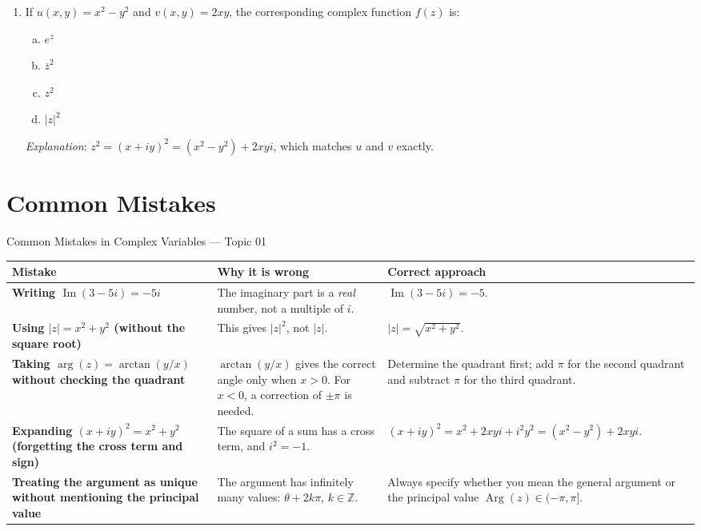 \documentclass[12pt,a4paper]{article}
\begin{document}
\begin{enumerate}
  \item If \(u(x,y) = x^2 - y^2\) and \(v(x,y) = 2xy\), the corresponding
        complex function \(f(z)\) is:
  \begin{enumerate}[(a)]
    \item \(e^z\)
    \item \(\overline{z}^2\)
    \item \textbf{\(z^2\)}
    \item \(|z|^2\)
  \end{enumerate}
  \textit{Explanation}: \(z^2 = (x+iy)^2 = (x^2-y^2)+2xyi\), which matches \(u\) and \(v\) exactly.
\end{enumerate}

\section{Common Mistakes}

\begin{mistakebox}{Common Mistakes in Complex Variables --- Topic 01}
\begin{tabular}{>{\bfseries}p{4.5cm} p{4.5cm} p{4.5cm}}
\toprule
Mistake & Why it is wrong & Correct approach \\
\midrule
Writing \(\operatorname{Im}(3-5i) = -5i\) &
The imaginary part is a \emph{real} number, not a multiple of \(i\). &
\(\operatorname{Im}(3-5i) = -5\). \\
\addlinespace
Using \(|z| = x^2+y^2\) (without the square root) &
This gives \(|z|^2\), not \(|z|\). &
\(|z| = \sqrt{x^2+y^2}\). \\
\addlinespace
Taking \(\arg(z) = \arctan(y/x)\) without checking the quadrant &
\(\arctan(y/x)\) gives the correct angle only when \(x > 0\).
For \(x < 0\), a correction of \(\pm\pi\) is needed. &
Determine the quadrant first; add \(\pi\) for the second quadrant and
subtract \(\pi\) for the third quadrant. \\
\addlinespace
Expanding \((x+iy)^2 = x^2 + y^2\) (forgetting the cross term and sign) &
The square of a sum has a cross term, and \(i^2 = -1\). &
\((x+iy)^2 = x^2 + 2xyi + i^2 y^2 = (x^2-y^2) + 2xyi\). \\
\addlinespace
Treating the argument as unique without mentioning the principal value &
The argument has infinitely many values: \(\theta + 2k\pi\), \(k\in\mathbb{Z}\). &
Always specify whether you mean the general argument or the principal value
\(\operatorname{Arg}(z) \in (-\pi,\pi]\). \\
\bottomrule
\end{tabular}
\end{mistakebox}
\end{document}
